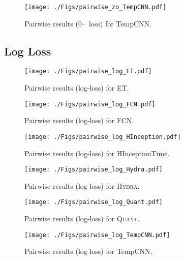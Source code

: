 \documentclass[twoside,11pt,preprint]{article}
\newcommand{\zo}{\mbox{0--\!1}~loss}
\newcommand{\quant}{\textsc{Quant}}
\newcommand{\hydra}{\textsc{Hydra}}
\begin{document}
\begin{figure}[h]%
    \centering%
    \texttt{[image: ./Figs/pairwise\_zo\_TempCNN.pdf]}%
    \caption{Pairwise results ({\zo}) for TempCNN.}%
\end{figure}%

\clearpage


\subsection{Log Loss}

\begin{figure}[h]%
    \centering%
    \texttt{[image: ./Figs/pairwise\_log\_ET.pdf]}%
    \caption{Pairwise results (log-loss) for ET.}%
\end{figure}%

\begin{figure}[h]%
    \centering%
    \texttt{[image: ./Figs/pairwise\_log\_FCN.pdf]}%
    \caption{Pairwise results (log-loss) for FCN.}%
\end{figure}%

\begin{figure}[h]%
    \centering%
    \texttt{[image: ./Figs/pairwise\_log\_HInception.pdf]}%
    \caption{Pairwise results (log-loss) for HInceptionTime.}%
\end{figure}%

\begin{figure}[h]%
    \centering%
    \texttt{[image: ./Figs/pairwise\_log\_Hydra.pdf]}%
    \caption{Pairwise results (log-loss) for {\hydra}.}%
\end{figure}%

\begin{figure}[h]%
    \centering%
    \texttt{[image: ./Figs/pairwise\_log\_Quant.pdf]}%
    \caption{Pairwise results (log-loss) for {\quant}.}%
\end{figure}%

\begin{figure}[h]%
    \centering%
    \texttt{[image: ./Figs/pairwise\_log\_TempCNN.pdf]}%
    \caption{Pairwise results (log-loss) for TempCNN.}%
\end{figure}%
\end{document}
